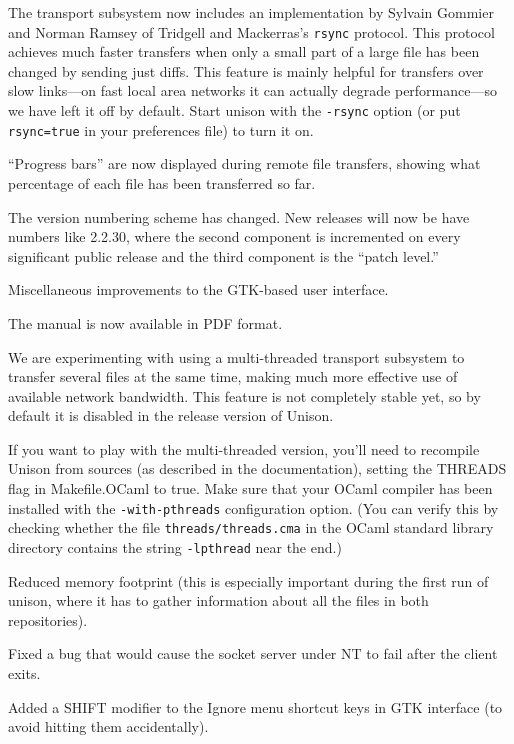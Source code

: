 \begin{changesfromversion}{2.1}
\item The transport subsystem now includes an implementation by
Sylvain Gommier and Norman Ramsey of Tridgell and Mackerras's
\verb|rsync| protocol.  This protocol achieves much faster
transfers when only a small part of a large file has been changed by
sending just diffs.  This feature is mainly helpful for transfers over
slow links---on fast local area networks it can actually degrade
performance---so we have left it off by default.  Start unison with
the \verb|-rsync| option (or put \verb|rsync=true| in your preferences
file) to turn it on.

\item ``Progress bars'' are now displayed during remote file transfers,
showing what percentage of each file has been transferred so far.

\item The version numbering scheme has changed.  New releases will now
      be have numbers like 2.2.30, where the second component is
      incremented on every significant public release and the third
      component is the ``patch level.''

\item Miscellaneous improvements to the GTK-based user interface.
\item The manual  is now available in PDF format.

\item We are experimenting with using a multi-threaded transport
subsystem to transfer several files at the same time, making
much more effective use of available network bandwidth.  This feature
is not completely stable yet, so by default it is disabled in the
release version of Unison.

If you want to play with the multi-threaded version, you'll need to
recompile Unison from sources (as described in the documentation),
setting the THREADS flag in Makefile.OCaml to true.  Make sure that
your OCaml compiler has been installed with the \verb|-with-pthreads|
configuration option.  (You can verify this by checking whether the
file \verb|threads/threads.cma| in the OCaml standard library
directory contains the string \verb|-lpthread| near the end.)
\end{changesfromversion}

\begin{changesfromversion}{1.292}
\item Reduced memory footprint (this is especially important during
the first run of unison, where it has to gather information about all
the files in both repositories).
\item Fixed a bug that would cause the socket server under NT to fail
  after the client exits.
\item Added a SHIFT modifier to the Ignore menu shortcut keys in GTK
  interface (to avoid hitting them accidentally).
\end{changesfromversion}

